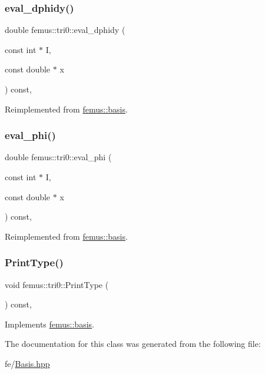 \subsubsection{\texorpdfstring{eval\+\_\+dphidy()}{eval\_dphidy()}}
{\footnotesize\ttfamily double femus\+::tri0\+::eval\+\_\+dphidy (\begin{DoxyParamCaption}\item[{const int $\ast$}]{I,  }\item[{const double $\ast$}]{x }\end{DoxyParamCaption}) const\hspace{0.3cm}{\ttfamily [inline]}, {\ttfamily [virtual]}}



Reimplemented from \mbox{\hyperlink{classfemus_1_1basis_a2819fac9aae797156b9efec8a0b85cc1}{femus\+::basis}}.

\mbox{\label{classfemus_1_1tri0_a8f439eb29f090a59be31e84de793853b}} 
\subsubsection{\texorpdfstring{eval\+\_\+phi()}{eval\_phi()}}
{\footnotesize\ttfamily double femus\+::tri0\+::eval\+\_\+phi (\begin{DoxyParamCaption}\item[{const int $\ast$}]{I,  }\item[{const double $\ast$}]{x }\end{DoxyParamCaption}) const\hspace{0.3cm}{\ttfamily [inline]}, {\ttfamily [virtual]}}



Reimplemented from \mbox{\hyperlink{classfemus_1_1basis_a89b0797cdccffae5ff6d059b32016ae5}{femus\+::basis}}.

\mbox{\label{classfemus_1_1tri0_af9e3d9ca27a7fcfef65802eb7ef3f21d}} 
\subsubsection{\texorpdfstring{Print\+Type()}{PrintType()}}
{\footnotesize\ttfamily void femus\+::tri0\+::\+Print\+Type (\begin{DoxyParamCaption}{ }\end{DoxyParamCaption}) const\hspace{0.3cm}{\ttfamily [inline]}, {\ttfamily [virtual]}}



Implements \mbox{\hyperlink{classfemus_1_1basis_abbae7bf8f31ec5793c911bc6d4ea0572}{femus\+::basis}}.



The documentation for this class was generated from the following file\+:\begin{DoxyCompactItemize}
\item 
fe/\mbox{\hyperlink{_basis_8hpp}{Basis.\+hpp}}\end{DoxyCompactItemize}
